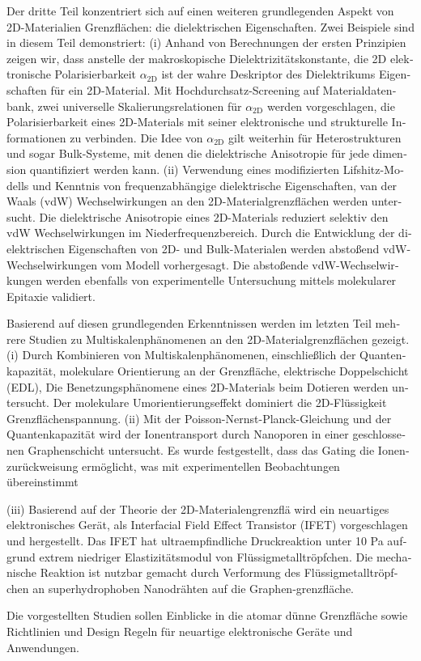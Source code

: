 \begin{otherlanguage}{ngerman}
Der dritte Teil konzentriert sich auf einen weiteren grundlegenden Aspekt von 2D-Materialien
Grenzflächen: die dielektrischen Eigenschaften.
%
%
Zwei Beispiele sind
in diesem Teil demonstriert:
%
(i) Anhand von Berechnungen der ersten Prinzipien zeigen wir, dass anstelle der
makroskopische Dielektrizitätskonstante, die 2D elektronische Polarisierbarkeit
$\alpha_{\mathrm{2D}}$ ist der wahre Deskriptor des Dielektrikums
Eigenschaften für ein 2D-Material.
%
Mit Hochdurchsatz-Screening auf Materialdatenbank, zwei universelle Skalierungsrelationen für $\alpha_{\mathrm{2D}}$
werden vorgeschlagen, die Polarisierbarkeit eines 2D-Materials mit seiner
elektronische und strukturelle Informationen zu verbinden.
%
Die Idee
von $\alpha_{\mathrm{2D}}$ gilt weiterhin für Heterostrukturen
und sogar Bulk-Systeme, mit denen die dielektrische Anisotropie für jede dimension quantifiziert werden kann.
%
(ii) Verwendung eines modifizierten Lifshitz-Modells und Kenntnis von
frequenzabhängige dielektrische Eigenschaften, van der Waals (vdW)
Wechselwirkungen an den 2D-Materialgrenzflächen werden untersucht.
%
Die dielektrische Anisotropie eines 2D-Materials reduziert selektiv den vdW
Wechselwirkungen im Niederfrequenzbereich.
%
Durch die Entwicklung der dielektrischen Eigenschaften von 2D- und Bulk-Materialen werden
 abstoßend
 vdW-Wechselwirkungen vom Modell vorhergesagt.
 Die abstoßende vdW-Wechselwirkungen werden ebenfalls von 
experimentelle Untersuchung mittels molekularer Epitaxie validiert.


Basierend auf diesen grundlegenden Erkenntnissen werden im letzten Teil mehrere Studien zu Multiskalenphänomenen an den 2D-Materialgrenzflächen gezeigt.
%
(i) Durch Kombinieren von Multiskalenphänomenen, einschließlich der Quantenkapazität,
molekulare Orientierung an der Grenzfläche, elektrische Doppelschicht (EDL),
Die Benetzungsphänomene eines 2D-Materials beim Dotieren werden untersucht.
Der molekulare Umorientierungseffekt dominiert die 2D-Flüssigkeit
Grenzflächenspannung.
%
(ii) Mit der Poisson-Nernst-Planck-Gleichung und der Quantenkapazität
wird der Ionentransport durch Nanoporen in einer geschlossenen
Graphenschicht untersucht.
Es wurde festgestellt, dass das Gating die
Ionenzurückweisung ermöglicht, was mit experimentellen Beobachtungen übereinstimmt

%
(iii) Basierend auf der Theorie der 2D-Materialengrenzflä wird  ein neuartiges elektronisches Gerät, als Interfacial Field Effect Transistor (IFET) vorgeschlagen und hergestellt.
%
Das IFET hat
ultraempfindliche Druckreaktion unter 10 Pa aufgrund extrem niedriger Elastizitätsmodul von Flüssigmetalltröpfchen. Die mechanische Reaktion ist
nutzbar gemacht durch Verformung des Flüssigmetalltröpfchen an superhydrophoben Nanodrähten auf die Graphen-grenzfläche.

Die vorgestellten Studien sollen Einblicke in die
atomar dünne Grenzfläche sowie Richtlinien und Design
Regeln für neuartige elektronische Geräte und Anwendungen.

\end{otherlanguage}

\endgroup

\vfill